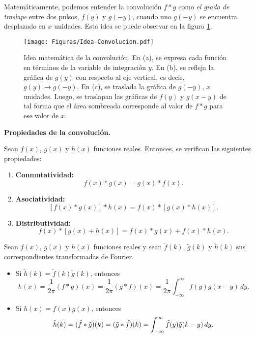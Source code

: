 Matemáticamente, podemos entender la convolución $f * g$ como \emph{el grado de traslape} entre dos pulsos, $f(y)$ y $g(-y)$, cuando uno $g(-y)$ se encuentra desplazado en $x$ unidades. Esta idea se puede observar en la figura \ref{fig:IdeaConvolucion}.

\begin{figure}[htbp]
    \centering
    \texttt{[image: Figuras/Idea-Convolucion.pdf]}
    \caption{Idea matemática de la convolución. En (a), se expresa cada función en términos de la variable de integración $y$. En (b), se refleja la gráfica de $g(y)$ con respecto al eje vertical, es decir, $g(y) \rightarrow g(-y)$. En (c), se traslada la gráfica de $g(-y)$, $x$ unidades. Luego, se traslapan las gráficas de $f(y)$ y $g(x-y)$ de tal forma que el área sombreada corresponde al valor de $f * g$ para ese valor de $x$.}
    \label{fig:IdeaConvolucion}
\end{figure}


\begin{propiedad}\textbf{Propiedades de la convolución.}

Sean $f(x)$, $g(x)$ y $h(x)$  funciones reales. Entonces, se verifican las siguientes propiedades:

\begin{enumerate}
    \item \textbf{Conmutatividad:}$$f(x) * g(x) = g(x) * f(x).$$
    
    \item \textbf{Asociatividad:} $$[f(x)*g(x)]*h(x) = f(x)*[g(x)*h(x)].$$
    
    \item \textbf{Distributividad:} $$f(x)*[g(x)+h(x)] = f(x)*g(x) + f(x)*h(x).$$ 
\end{enumerate}
\end{propiedad}

\newpage

\begin{teorema}
Sean $f(x)$, $g(x)$ y $h(x)$  funciones reales y sean $\tilde{f}(k)$, $\tilde{g}(k)$ y $\tilde{h}(k)$ sus correspondientes transformadas de Fourier. 

\begin{itemize}
    \item Si $\tilde{h}(k) = \tilde{f}(k) \tilde{g}(k)$, entonces 
$$ h(x) = \frac{1}{2\pi} (f * g)(x) = \frac{1}{2\pi} (g * f)(x) = \frac{1}{2\pi} \int_{-\infty}^{\infty} f(y) g(x-y) \,dy.$$ 

    \item Si $h(x) = f(x) g(x)$, entonces
$$\Tilde{h}(k) = (\Tilde{f} * \Tilde{g})(k) = (\Tilde{g} * \Tilde{f})(k) = \int_{-\infty}^{\infty} \Tilde{f}(y) \Tilde{g}(k-y) \,dy.$$
\end{itemize}
\end{teorema}

